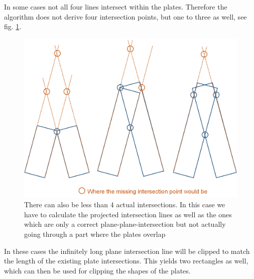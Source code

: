 \documentclass[../ClassicThesis.tex]{subfiles}
\begin{document}
In some cases not all four lines intersect within the plates. Therefore the algorithm does not derive four intersection points, but one to three as well, see fig. \ref{fig:casesOfLines}. 
\begin{figure}[!ht]
\centering
\includegraphics[width=\columnwidth]{Images/10-joints-casesOfLines.png}
\caption{There can also be less than 4 actual intersections. In this case we have to calculate the projected intersection lines as well as the ones which are only a correct plane-plane-intersection but not actually going through a part where the plates overlap}
\label{fig:casesOfLines}
\end{figure}

In these cases the infinitely long plane intersection line will be clipped to match the length of the existing plate intersections. This yields two rectangles as well, which can then be used for clipping the shapes of the plates.
\end{document}
